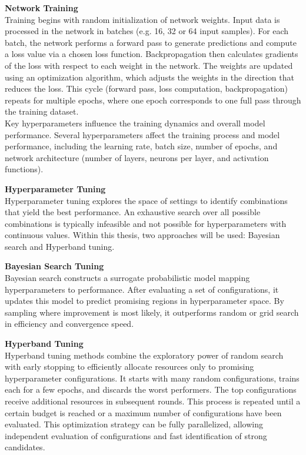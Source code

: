 \textbf{Network Training}\\
Training begins with random initialization of network weights. Input data is processed in the network in batches (e.g. 16, 32 or 64 input samples). For each batch, the network performs a forward pass to generate predictions and compute a loss value via a chosen loss function. Backpropagation then calculates gradients of the loss with respect to each weight in the network. The weights are updated using an optimization algorithm, which adjusts the weights in the direction that reduces the loss. This cycle (forward pass, loss computation, backpropagation) repeats for multiple epochs, where one epoch corresponds to one full pass through the training dataset. \\
Key hyperparameters influence the training dynamics and overall model performance. Several hyperparameters affect the training process and model performance, including the learning rate, batch size, number of epochs, and network architecture (number of layers, neurons per layer, and activation functions).

\textbf{Hyperparameter Tuning}\\
Hyperparameter tuning explores the space of settings to identify combinations that yield the best performance. An exhaustive search over all possible combinations is typically infeasible and not possible for hyperparameters with continuous values. Within this thesis, two approaches will be used: Bayesian search and Hyperband tuning.

\textbf{Bayesian Search Tuning}\\
Bayesian search constructs a surrogate probabilistic model mapping hyperparameters to performance. After evaluating a set of configurations, it updates this model to predict promising regions in hyperparameter space. By sampling where improvement is most likely, it outperforms random or grid search in efficiency and convergence speed.

\textbf{Hyperband Tuning}\\
Hyperband tuning methods combine the exploratory power of random search with early stopping to efficiently allocate resources only to promising hyperparameter configurations. It starts with many random configurations, trains each for a few epochs, and discards the worst performers. The top configurations receive additional resources in subsequent rounds. This process is repeated until a certain budget is reached or a maximum number of configurations have been evaluated. This optimization strategy can be fully parallelized, allowing independent evaluation of configurations and fast identification of strong candidates. 


